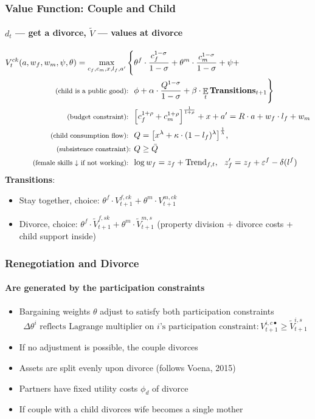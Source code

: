 \documentclass[aspectratio=169]{beamer}
\DeclareMathOperator{\E}{\mathbb{E}}
\let\olditem\item
\renewcommand{\item}{%
\olditem\vspace{\fill}}
\begin{document}
\begin{frame}
\frametitle{Value Function: Couple and Child}
\framesubtitle{$d_t$ --- get a divorce, $\tilde{V}$ --- values at divorce}
\vspace{-1cm}
\begin{align*}
V^{ck}_t(a,w_f,w_m,\psi,\theta) = \max\limits_{c_f,c_m,x,l_f,a'} \Bigg\{ & \theta^f \cdot \frac{c_f^{1-\sigma}}{{1-\sigma}}  + \theta^m \cdot \frac{c_m^{1-\sigma}}{1-\sigma}  + \psi + \\ \text{ \footnotesize (child is a public good): \ }  & \phi + \alpha \cdot \frac{Q^{1-\sigma}}{1-\sigma} +  \beta \cdot \E_t \text{\textbf{Transitions}}_{t+1}  \Bigg\} \\
\text{ \footnotesize (budget constraint): \ } &{\normalsize \left[c_f^{1+\rho} + c_m^{1+\rho}\right]^{\frac1{1+\rho}} + x + a' = R\cdot a + w_f\cdot l_f + w_m}\\
\text{ \footnotesize (child consumption flow): \ } &{\normalsize Q = \left[x^\lambda + \kappa \cdot (1-l_f)^\lambda\right]^{\frac1\lambda}}, \\
\text{ \footnotesize  (subsistence constraint): } & Q\geq \bar{Q} \\
\text{ \footnotesize (female skills $\downarrow$ if not working): \ } &{\normalsize \log w_f = z_f + \text{Trend}_{f,t}, \ \ z'_f = z_f + \varepsilon^f - \delta(l^f)}
\end{align*}
\textbf{Transitions}:
\begin{itemize}
\item  \footnotesize Stay together, choice: $\theta^f \cdot V^{f,ck}_{t+1} + \theta^m \cdot V^{m,ck}_{t+1}$
\item  \footnotesize Divorce, choice: $\theta^f \cdot \tilde V^{f,sk}_{t+1} + \theta^m \cdot \tilde V^{m,s}_{t+1}$ (property division + divorce costs + child support inside)
\end{itemize}
\end{frame}



\begin{frame}
\frametitle{Renegotiation and Divorce}
\framesubtitle{Are generated by the participation constraints}
\begin{itemize}
\item Bargaining weights $\theta$ adjust to satisfy both participation constraints
\[\Delta \theta^i \text{ reflects Lagrange multiplier on $i$'s participation constraint}: V^{i,c\bullet}_{t+1} \geq \tilde{V}^{i,s}_{t+1}\]
\item If no adjustment is possible, the couple divorces
\item Assets are split evenly upon divorce (follows Voena, 2015)
\item Partners have fixed utility costs $\phi_d$ of divorce
\item If couple with a child divorces wife becomes a single mother
\end{itemize}
\end{frame}
\end{document}
